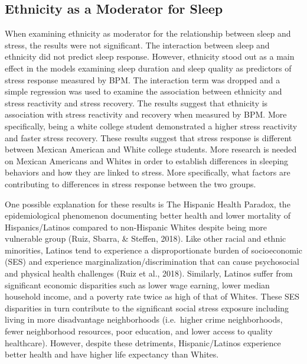 \documentclass[man, fleqn, noextraspace]{apa6}
\begin{document}
\hypertarget{ethnicity-as-a-moderator-for-sleep}{%
\subsection{Ethnicity as a Moderator for Sleep}\label{ethnicity-as-a-moderator-for-sleep}}

When examining ethnicity as moderator for the relationship between sleep and stress, the results were not significant. The interaction between sleep and ethnicity did not predict sleep response. However, ethnicity stood out as a main effect in the models examining sleep duration and sleep quality as predictors of stress response measured by BPM. The interaction term was dropped and a simple regression was used to examine the association between ethnicity and stress reactivity and stress recovery. The results suggest that ethnicity is association with stress reactivity and recovery when measured by BPM. More specifically, being a white college student demonstrated a higher stress reactivity and faster stress recovery. These results suggest that stress response is different between Mexican American and White college students. More research is needed on Mexican Americans and Whites in order to establish differences in sleeping behaviors and how they are linked to stress. More specifically, what factors are contributing to differences in stress response between the two groups.

One possible explanation for these results is The Hispanic Health Paradox, the epidemiological phenomenon documenting better health and lower mortality of Hispanics/Latinos compared to non-Hispanic Whites despite being more vulnerable group (Ruiz, Sbarra, \& Steffen, 2018). Like other racial and ethnic minorities, Latinos tend to experience a disproportionate burden of socioeconomic (SES) and experience marginalization/discrimination that can cause psychosocial and physical health challenges (Ruiz et al., 2018). Similarly, Latinos suffer from significant economic disparities such as lower wage earning, lower median household income, and a poverty rate twice as high of that of Whites. These SES disparities in turn contribute to the significant social stress exposure including living in more disadvantage neighborhoods (i.e.~higher crime neighborhoods, fewer neighborhood resources, poor education, and lower access to quality healthcare). However, despite these detriments, Hispanic/Latinos experience better health and have higher life expectancy than Whites.
\end{document}
